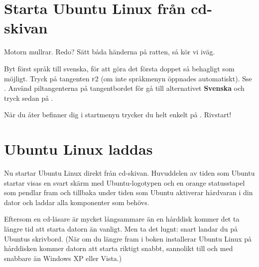 \documentclass[a4paper,final]{memoir} %
\begin{document}
\xnegskip{}


\section{Starta Ubuntu Linux från cd-skivan}\label{sec:startalinux}




Motorn mullrar. Redo? Sätt båda händerna på ratten, så kör vi iväg.

Byt först språk till svenska, för att göra det första doppet så behagligt som möjligt. Tryck på tangenten \textsc{f2} (om inte språkmenyn öppnades automatiskt). Sse . Använd piltangenterna på tangentbordet för gå till alternativet \textbf{Svenska} och tryck sedan på \xenter{}.


När du åter befinner dig i startmenyn trycker du helt enkelt på \xenter{}. Rivstart!


\section{Ubuntu Linux laddas}

Nu startar Ubuntu Linux direkt från cd-skivan. Huvuddelen av tiden som Ubuntu startar visas en svart skärm med Ubuntu-logotypen och en orange statusstapel som pendlar fram och tillbaka under tiden som Ubuntu aktiverar hårdvaran i din dator och laddar alla komponenter som behövs.

Eftersom en cd-läsare är mycket långsammare än en hårddisk kommer det ta längre tid att starta datorn än vanligt. Men ta det lugnt: snart landar du på Ubuntus skrivbord. (När om du längre fram i boken installerar Ubuntu Linux på hårddisken kommer datorn att starta riktigt snabbt, sannolikt till och med snabbare än Windows XP eller Vista.)
\end{document}
